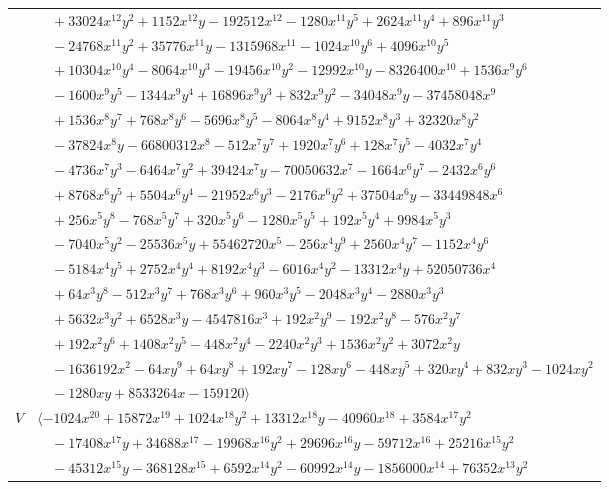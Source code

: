 \documentclass[11pt]{article}
\begin{document}
\begin{longtable}{@{}ll@{}}
 & $\quad +33024x^{12}y^{2}+1152x^{12}y-192512x^{12}-1280x^{11}y^{5}+2624x^{11}y^{4}+896x^{11}y^{3}$\\
 & $\quad -24768x^{11}y^{2}+35776x^{11}y-1315968x^{11}-1024x^{10}y^{6}+4096x^{10}y^{5}$\\
 & $\quad +10304x^{10}y^{4}-8064x^{10}y^{3}-19456x^{10}y^{2}-12992x^{10}y-8326400x^{10}+1536x^{9}y^{6}$\\
 & $\quad -1600x^{9}y^{5}-1344x^{9}y^{4}+16896x^{9}y^{3}+832x^{9}y^{2}-34048x^{9}y-37458048x^{9}$\\
 & $\quad +1536x^{8}y^{7}+768x^{8}y^{6}-5696x^{8}y^{5}-8064x^{8}y^{4}+9152x^{8}y^{3}+32320x^{8}y^{2}$\\
 & $\quad -37824x^{8}y-66800312x^{8}-512x^{7}y^{7}+1920x^{7}y^{6}+128x^{7}y^{5}-4032x^{7}y^{4}$\\
 & $\quad -4736x^{7}y^{3}-6464x^{7}y^{2}+39424x^{7}y-70050632x^{7}-1664x^{6}y^{7}-2432x^{6}y^{6}$\\
 & $\quad +8768x^{6}y^{5}+5504x^{6}y^{4}-21952x^{6}y^{3}-2176x^{6}y^{2}+37504x^{6}y-33449848x^{6}$\\
 & $\quad +256x^{5}y^{8}-768x^{5}y^{7}+320x^{5}y^{6}-1280x^{5}y^{5}+192x^{5}y^{4}+9984x^{5}y^{3}$\\
 & $\quad -7040x^{5}y^{2}-25536x^{5}y+55462720x^{5}-256x^{4}y^{9}+2560x^{4}y^{7}-1152x^{4}y^{6}$\\
 & $\quad -5184x^{4}y^{5}+2752x^{4}y^{4}+8192x^{4}y^{3}-6016x^{4}y^{2}-13312x^{4}y+52050736x^{4}$\\
 & $\quad +64x^{3}y^{8}-512x^{3}y^{7}+768x^{3}y^{6}+960x^{3}y^{5}-2048x^{3}y^{4}-2880x^{3}y^{3}$\\
 & $\quad +5632x^{3}y^{2}+6528x^{3}y-4547816x^{3}+192x^{2}y^{9}-192x^{2}y^{8}-576x^{2}y^{7}$\\
 & $\quad +192x^{2}y^{6}+1408x^{2}y^{5}-448x^{2}y^{4}-2240x^{2}y^{3}+1536x^{2}y^{2}+3072x^{2}y$\\
 & $\quad -1636192x^{2}-64xy^{9}+64xy^{8}+192xy^{7}-128xy^{6}-448xy^{5}+320xy^{4}+832xy^{3}-1024xy^{2}$\\
 & $\quad -1280xy+8533264x-159120\rangle$\\
$V$ & $\langle -1024x^{20}+15872x^{19}+1024x^{18}y^{2}+13312x^{18}y-40960x^{18}+3584x^{17}y^{2}$\\
 & $\quad -17408x^{17}y+34688x^{17}-19968x^{16}y^{2}+29696x^{16}y-59712x^{16}+25216x^{15}y^{2}$\\
 & $\quad -45312x^{15}y-368128x^{15}+6592x^{14}y^{2}-60992x^{14}y-1856000x^{14}+76352x^{13}y^{2}$\\

\end{longtable}
\end{document}
